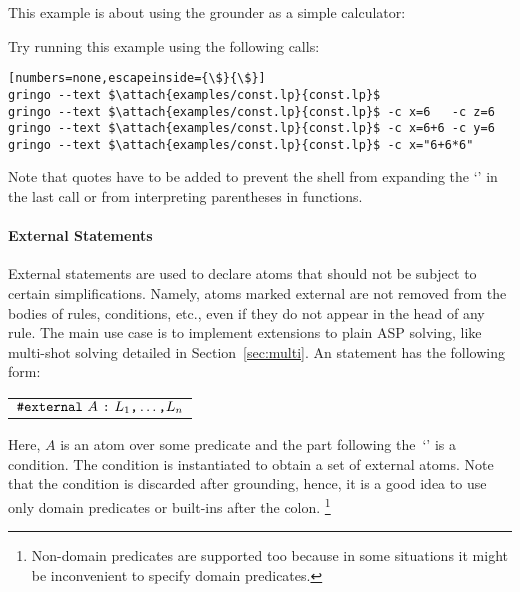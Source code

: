 \begin{example}
This example is about using the grounder as a simple calculator:
%

%
Try running this example using the following calls:
%
\begin{lstlisting}[numbers=none,escapeinside={\$}{\$}]
gringo --text $\attach{examples/const.lp}{const.lp}$
gringo --text $\attach{examples/const.lp}{const.lp}$ -c x=6   -c z=6
gringo --text $\attach{examples/const.lp}{const.lp}$ -c x=6+6 -c y=6
gringo --text $\attach{examples/const.lp}{const.lp}$ -c x="6+6*6"
\end{lstlisting}
%
Note that quotes have to be added to prevent the shell from expanding the `\code{*}' in the last call
or from interpreting parentheses in functions.
\end{example}

\paragraph{External Statements}
%
External statements are used to declare atoms
that should not be subject to certain simplifications.
Namely,
atoms marked external are not removed from the bodies of rules, conditions, etc.,
even if they do not appear in the head of any rule.
The main use case is to implement extensions to plain ASP solving,
like multi-shot solving detailed in Section~\ref{sec:multi}.
An  statement has the following form:
%
\par
\medskip
\begin{tabular}{l}
$\texttt{\#external}~A~\texttt{:}~L_1\text{\texttt{,}}\dots\text{\texttt{,}}L_n$\code{.}
\end{tabular}
\par
\medskip
\noindent
%
Here, $A$ is an atom over some predicate and
the part following the~`\code{:}' is a condition.
The condition is instantiated to obtain a set of external atoms.
Note that the condition is discarded after grounding,
hence, it is a good idea to use only domain predicates or built-ins after the colon.%
\footnote{Non-domain predicates are supported too
because in some situations it might be inconvenient to specify domain predicates.}

